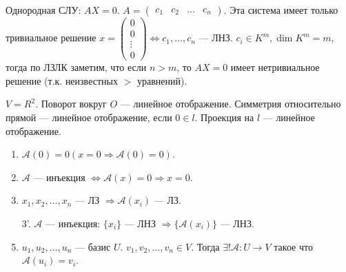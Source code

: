Однородная СЛУ: $AX = 0$.  $A = \begin{pmatrix} c_1 & c_2 & \ldots & c_n \end{pmatrix}$. Эта система имеет только  тривиальное решение $x = \begin{pmatrix} 0 \\ 0 \\ \vdots \\ 0\end{pmatrix} \iff c_1, \ldots, c_n$ --- ЛНЗ. $c_i \in K^m, \dim K^m = m$, тогда по ЛЗЛК заметим, что если $n > m$, то  $AX=0$ имеет нетривиальное решение (т.к. неизвестных $>$ уравнений).
\begin{example}
   $V=R^2$. Поворот вокруг $O$ --- линейное отображение. Симметрия относительно прямой --- линейное отображение, если  $0 \in l$. Проекция на  $l$ --- линейное отображение.
\end{example}
\begin{properties}
    \begin{enumerate}
        \item $\mathcal{A}(0) = 0 (x = 0 \Rightarrow \mathcal{A}(0) = 0)$.
        \item $\mathcal{A}$ --- инъекция  $\iff \mathcal{A}(x) = 0 \Rightarrow x = 0$.
        \item $x_1, x_2, \ldots, x_n$ --- ЛЗ $\Rightarrow \mathcal{A}(x_i)$ --- ЛЗ.
        \item[3'.] $\mathcal{A}$ --- инъекция:  $\{x_i \}$ --- ЛНЗ  $\Rightarrow \{\mathcal{A}(x_i)\}$ --- ЛНЗ.
        \item  $u_1, u_2, \ldots, u_n$ --- базис $U$.  $v_1, v_2, \ldots, v_n \in V$. Тогда $\exists! \mathcal{A}\!: U \to V$ такое что  $\mathcal{A}(u_i) = v_i$.
    \end{enumerate}
\end{properties}
